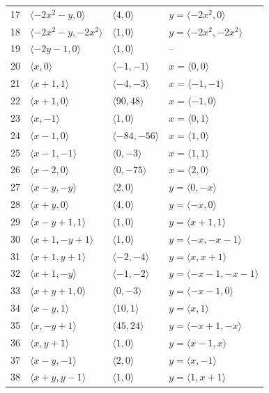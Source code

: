 \documentclass[11pt]{article}
\begin{document}
\begin{longtable}{@{}rlll@{}}
17 & $\langle -2x^{2}-y,0\rangle$ & $\langle 4,0\rangle$ & $y=\langle -2x^{2},0\rangle$\\
18 & $\langle -2x^{2}-y,-2x^{2}\rangle$ & $\langle 1,0\rangle$ & $y=\langle -2x^{2},-2x^{2}\rangle$\\
19 & $\langle -2y-1,0\rangle$ & $\langle 1,0\rangle$ & --\\
20 & $\langle x,0\rangle$ & $\langle -1,-1\rangle$ & $x=\langle 0,0\rangle$\\
21 & $\langle x+1,1\rangle$ & $\langle -4,-3\rangle$ & $x=\langle -1,-1\rangle$\\
22 & $\langle x+1,0\rangle$ & $\langle 90,48\rangle$ & $x=\langle -1,0\rangle$\\
23 & $\langle x,-1\rangle$ & $\langle 1,0\rangle$ & $x=\langle 0,1\rangle$\\
24 & $\langle x-1,0\rangle$ & $\langle -84,-56\rangle$ & $x=\langle 1,0\rangle$\\
25 & $\langle x-1,-1\rangle$ & $\langle 0,-3\rangle$ & $x=\langle 1,1\rangle$\\
26 & $\langle x-2,0\rangle$ & $\langle 0,-75\rangle$ & $x=\langle 2,0\rangle$\\
27 & $\langle x-y,-y\rangle$ & $\langle 2,0\rangle$ & $y=\langle 0,-x\rangle$\\
28 & $\langle x+y,0\rangle$ & $\langle 4,0\rangle$ & $y=\langle -x,0\rangle$\\
29 & $\langle x-y+1,1\rangle$ & $\langle 1,0\rangle$ & $y=\langle x+1,1\rangle$\\
30 & $\langle x+1,-y+1\rangle$ & $\langle 1,0\rangle$ & $y=\langle -x,-x-1\rangle$\\
31 & $\langle x+1,y+1\rangle$ & $\langle -2,-4\rangle$ & $y=\langle x,x+1\rangle$\\
32 & $\langle x+1,-y\rangle$ & $\langle -1,-2\rangle$ & $y=\langle -x-1,-x-1\rangle$\\
33 & $\langle x+y+1,0\rangle$ & $\langle 0,-3\rangle$ & $y=\langle -x-1,0\rangle$\\
34 & $\langle x-y,1\rangle$ & $\langle 10,1\rangle$ & $y=\langle x,1\rangle$\\
35 & $\langle x,-y+1\rangle$ & $\langle 45,24\rangle$ & $y=\langle -x+1,-x\rangle$\\
36 & $\langle x,y+1\rangle$ & $\langle 1,0\rangle$ & $y=\langle x-1,x\rangle$\\
37 & $\langle x-y,-1\rangle$ & $\langle 2,0\rangle$ & $y=\langle x,-1\rangle$\\
38 & $\langle x+y,y-1\rangle$ & $\langle 1,0\rangle$ & $y=\langle 1,x+1\rangle$\\

\end{longtable}
\end{document}
